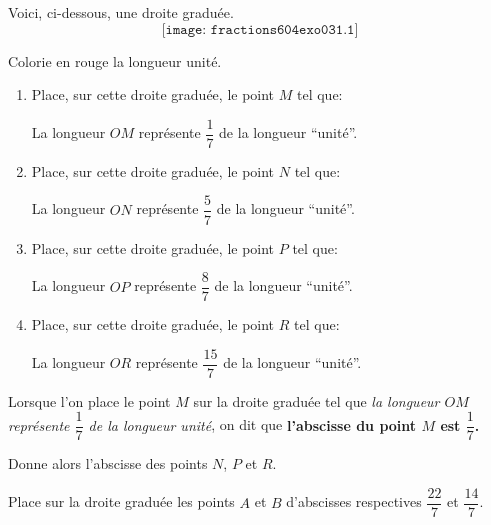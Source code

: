 Voici, ci-dessous, une droite graduée.
\[\texttt{[image: fractions604exo031.1]}\]
\begin{myenumerate}
  \item Colorie en rouge la longueur \og{}unité\fg.
  \item
    \begin{enumerate}
    \item Place, sur cette droite graduée, le point $M$ tel que:
      \begin{center}
        {\begin{cursive}La longueur $OM$ représente $\dfrac17$ de la longueur ``unité''.\end{cursive}}
      \end{center}
    \item Place, sur cette droite graduée, le point $N$ tel que:
      \begin{center}
        {\begin{cursive}La longueur $ON$ représente $\dfrac57$ de la longueur ``unité''.\end{cursive}}
      \end{center}
    \item Place, sur cette droite graduée, le point $P$ tel que:
      \begin{center}
        {\begin{cursive}La longueur $OP$ représente $\dfrac87$ de la longueur ``unité''.\end{cursive}}
      \end{center}
    \item Place, sur cette droite graduée, le point $R$ tel que:
      \begin{center}
        {\begin{cursive}La longueur $OR$ représente $\dfrac{15}7$ de la longueur ``unité''.\end{cursive}}
      \end{center}
    \end{enumerate}
  \item Lorsque l'on place le point $M$ sur la droite graduée tel que {\em la longueur $OM$ représente $\dfrac17$ de la longueur \og{}unité\fg{}}, on dit que {\bf l'abscisse du point $M$ est $\dfrac17$.}\par Donne alors l'abscisse des points $N$, $P$ et $R$.
  \item Place sur la droite graduée les points $A$ et $B$ d'abscisses respectives $\dfrac{22}7$ et $\dfrac{14}7$.
\end{myenumerate}